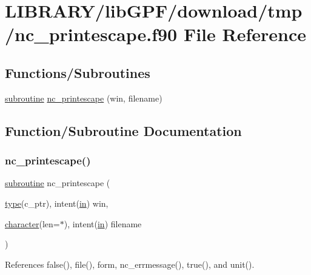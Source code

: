 \hypertarget{nc__printescape_8f90}{}\section{L\+I\+B\+R\+A\+R\+Y/lib\+G\+P\+F/download/tmp/nc\+\_\+printescape.f90 File Reference}
\label{nc__printescape_8f90}
\subsection*{Functions/\+Subroutines}
\begin{DoxyCompactItemize}
\item 
\hyperlink{M__stopwatch_83_8txt_acfbcff50169d691ff02d4a123ed70482}{subroutine} \hyperlink{nc__printescape_8f90_a980685b54c9fb58728ac0d9a3ff837f0}{nc\+\_\+printescape} (win, filename)
\end{DoxyCompactItemize}


\subsection{Function/\+Subroutine Documentation}
\mbox{\label{nc__printescape_8f90_a980685b54c9fb58728ac0d9a3ff837f0}} 
\subsubsection{\texorpdfstring{nc\+\_\+printescape()}{nc\_printescape()}}
{\footnotesize\ttfamily \hyperlink{M__stopwatch_83_8txt_acfbcff50169d691ff02d4a123ed70482}{subroutine} nc\+\_\+printescape (\begin{DoxyParamCaption}\item[{\hyperlink{stop__watch_83_8txt_a70f0ead91c32e25323c03265aa302c1c}{type}(c\+\_\+ptr), intent(\hyperlink{M__journal_83_8txt_afce72651d1eed785a2132bee863b2f38}{in})}]{win,  }\item[{\hyperlink{option__stopwatch_83_8txt_abd4b21fbbd175834027b5224bfe97e66}{character}(len=$\ast$), intent(\hyperlink{M__journal_83_8txt_afce72651d1eed785a2132bee863b2f38}{in})}]{filename }\end{DoxyParamCaption})}



References false(), file(), form, nc\+\_\+errmessage(), true(), and unit().


